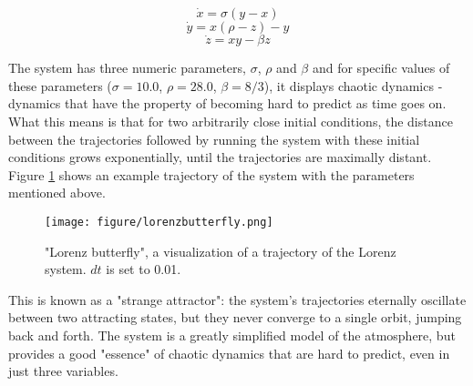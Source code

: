 \begin{equation}
\dot{x} = \sigma (y - x)
\label{eq:xlor}
\end{equation}
\begin{equation}
\dot{y} = x(\rho - z) - y
\label{eq:ylor}
\end{equation}
\begin{equation}
\dot{z} = xy - \beta z
\label{eq:zlor}
\end{equation}

The system has three numeric parameters, $\sigma$, $\rho$ and $\beta$ and for specific values of these parameters ($\sigma = 10.0$, $\rho = 28.0$, $\beta = 8/3$), it displays chaotic dynamics - dynamics that have the property of becoming hard to predict as time goes on. What this means is that for two arbitrarily close initial conditions, the distance between the trajectories followed by running the system with these initial conditions grows exponentially, until the trajectories are maximally distant. Figure \ref{fig:lorenzbutterfly} shows an example trajectory of the system with the parameters mentioned above.

\begin{figure}
    \centering
    \texttt{[image: figure/lorenzbutterfly.png]}
    \caption{"Lorenz butterfly", a visualization of a trajectory of the Lorenz system. $dt$ is set to 0.01.}
    \label{fig:lorenzbutterfly}
\end{figure}

This is known as a "strange attractor": the system's trajectories eternally oscillate between two attracting states, but they never converge to a single orbit, jumping back and forth. The system is a greatly simplified model of the atmosphere, but provides a good "essence" of chaotic dynamics that are hard to predict, even in just three variables. 

